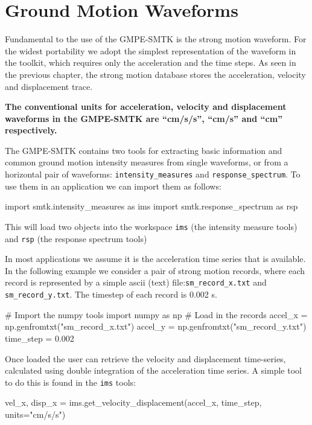 \section{Ground Motion Waveforms}
\label{sec:ims}

Fundamental to the use of the GMPE-SMTK is the strong motion waveform. For the widest portability we adopt the simplest representation of the waveform in the toolkit, which requires only the acceleration and the time steps. As seen in the previous chapter, the strong motion database stores the acceleration, velocity and displacement trace. 

\textbf{The conventional units for acceleration, velocity and displacement waveforms in the GMPE-SMTK are ``cm/s/s'', ``cm/s'' and ``cm'' respectively.}

The GMPE-SMTK contains two tools for extracting basic information and common ground motion intensity measures from single waveforms, or from a horizontal pair of waveforms: \verb=intensity_measures= and \verb=response_spectrum=. To use them in an application we can import them as follows:

\begin{python}[frame=single]
import smtk.intensity_measures as ims
import smtk.response_spectrum as rsp
\end{python}

This will load two objects into the workspace \verb=ims= (the intensity measure tools) and \verb=rsp= (the response spectrum tools)

In most applications we assume it is the acceleration time series that is available. In the following example we consider a pair of strong motion records, where each record is represented by a simple ascii (text) file:\verb=sm_record_x.txt= and \verb=sm_record_y.txt=. The timestep of each record is 0.002 s.

\begin{python}[frame=single]
# Import the numpy tools
import numpy as np
# Load in the records
accel_x = np.genfromtxt("sm_record_x.txt")
accel_y = np.genfromtxt("sm_record_y.txt")
time_step = 0.002
\end{python}

Once loaded the user can retrieve the velocity and displacement time-series, calculated using double integration of the acceleration time series. A simple tool to do this is found in the \verb=ims= tools:

\begin{python}[frame=single]
vel_x, disp_x = ims.get_velocity_displacement(accel_x,
                                              time_step,
                                              units="cm/s/s") 
\end{python}

